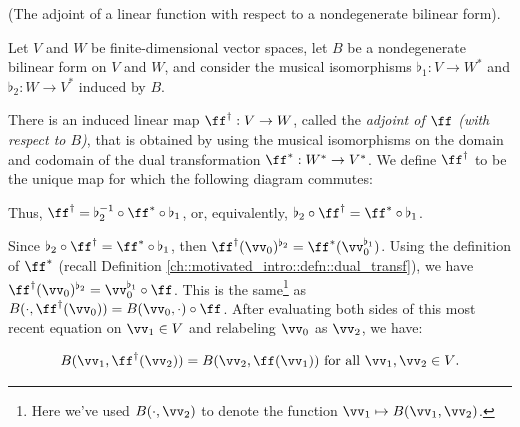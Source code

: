 \begin{deriv}
\label{ch::appendix::defn::dual_transf_after_id}
    (The adjoint of a linear function with respect to a nondegenerate bilinear form).
    
    Let $V$ and $W$ be finite-dimensional vector spaces, let $B$ be a nondegenerate bilinear form on $V$ and $W$, and consider the musical isomorphisms $\flat_1:V \rightarrow W^{*}$ and $\flat_2:W \rightarrow V^{*}$ induced by $B$.
    
    There is an induced linear map $\ff^\dag:V \rightarrow W$, called the \textit{adjoint of $\ff$ (with respect to $B$)}, that is obtained by using the musical isomorphisms on the domain and codomain of the dual transformation $\ff^*:W^* \rightarrow V^*$. We define $\ff^\dag$ to be the unique map for which the following diagram commutes:
    
    \begin{center}
    \end{center}
    
    Thus, $\ff^\dag = \flat_2^{-1} \circ \ff^* \circ \flat_1$, or, equivalently, $\flat_2 \circ \ff^\dag = \ff^* \circ \flat_1$.
    
    Since $\flat_2 \circ \ff^\dag = \ff^* \circ \flat_1$, then $\ff^\dag(\vv_0)^{\flat_2} = \ff^*(\vv_0^{\flat_1})$. Using the definition of $\ff^*$ (recall Definition \ref{ch::motivated_intro::defn::dual_transf}), we have $\ff^\dag(\vv_0)^{\flat_2} = \vv_0^{\flat_1} \circ \ff$. This is the same\footnote{Here we've used $B(\cdot, \vv_2)$ to denote the function $\vv_1 \mapsto B(\vv_1, \vv_2)$.} as $B(\cdot, \ff^\dag(\vv_0)) = B(\vv_0, \cdot) \circ \ff$. After evaluating both sides of this most recent equation on $\vv_1 \in V$ and relabeling $\vv_0$ as $\vv_2$, we have:
    
    \begin{align*}
        B(\vv_1, \ff^\dag(\vv_2)) = B(\vv_2, \ff(\vv_1)) \text{ for all $\vv_1, \vv_2 \in V$}.
    \end{align*}
\end{deriv}

